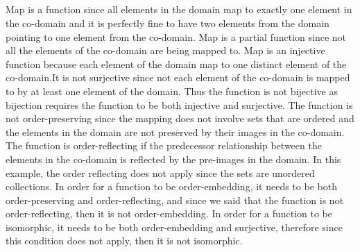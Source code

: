 \documentclass{article}
\begin{document}
\subsection{}
Map is a function since all elements in the domain map to exactly one element in the co-domain and it is perfectly fine to have two elements from the domain pointing to one element from the co-domain. \newline
Map is a partial function since not all the elements of the co-domain are being mapped to.
\newline
Map is  an injective function because each element of the domain map to one distinct element of the co-domain.It is not surjective since not each element of the co-domain is mapped to by at least one element of the domain. Thus the function is not bijective as bijection requires the function to be both injective and surjective.\newline
The function is not order-preserving since the mapping does not involve sets that are ordered and the elements in the domain are not preserved by their images in the co-domain.
The function is order-reflecting if the predecessor relationship between the elements in the co-domain is reflected by the pre-images in the domain. In this example, the order reflecting does not apply since the sets are unordered collections. In order for a function to be order-embedding, it needs to be both order-preserving and order-reflecting, and since we said that the function is not order-reflecting, then it is not order-embedding. In order for a function to be isomorphic, it needs to be both order-embedding and surjective, therefore since this condition does not apply, then it is not isomorphic. 
\newline\newline
\end{document}
